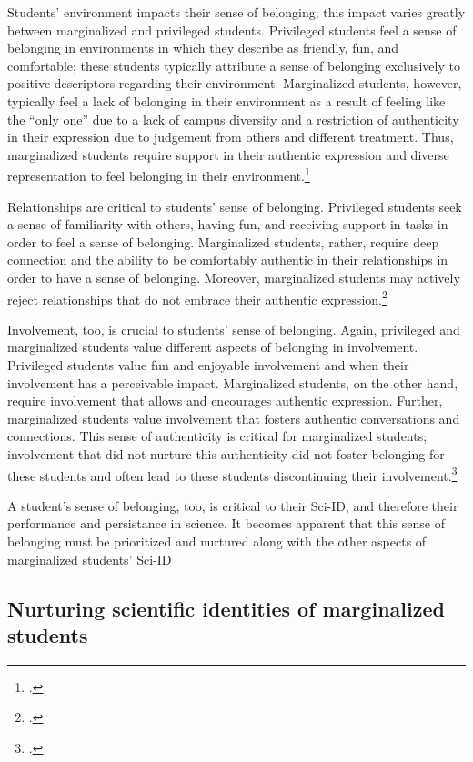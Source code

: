 \documentclass[10pt, twocolumn]{article}
\begin{document}
            Students' environment impacts their sense of belonging; this impact varies greatly between marginalized and privileged students. Privileged students feel a sense of belonging in environments in which they describe as friendly, fun, and comfortable; these students typically attribute a sense of belonging exclusively to positive descriptors regarding their environment. Marginalized students, however, typically feel a lack of belonging in their environment as a result of feeling like the ``only one'' due to a lack of campus diversity and a restriction of authenticity in their expression due to judgement from others and different treatment. Thus, marginalized students require support in their authentic expression and diverse representation to feel belonging in their environment.\footcite{vaccaro_development_2016}

            Relationships are critical to students' sense of belonging. Privileged students seek a sense of familiarity with others, having fun, and receiving support in tasks in order to feel a sense of belonging. Marginalized students, rather, require deep connection and the ability to be comfortably authentic in their relationships in order to have a sense of belonging. Moreover, marginalized students may actively reject relationships that do not embrace their authentic expression.\footcite{vaccaro_development_2016}

            Involvement, too, is crucial to students' sense of belonging. Again, privileged and marginalized students value different aspects of belonging in involvement. Privileged students value fun and enjoyable involvement and when their involvement has a perceivable impact. Marginalized students, on the other hand, require involvement that allows and encourages authentic expression. Further, marginalized students value involvement that fosters authentic conversations and connections. This sense of authenticity is critical for marginalized students; involvement that did not nurture this authenticity did not foster belonging for these students and often lead to these students discontinuing their involvement.\footcite{vaccaro_development_2016}

            A student's sense of belonging, too, is critical to their Sci-ID, and therefore their performance and persistance in science. It becomes apparent that this sense of belonging must be prioritized and nurtured along with the other aspects of marginalized students' Sci-ID

    \subsection{Nurturing scientific identities of marginalized students}
        
\end{document}
